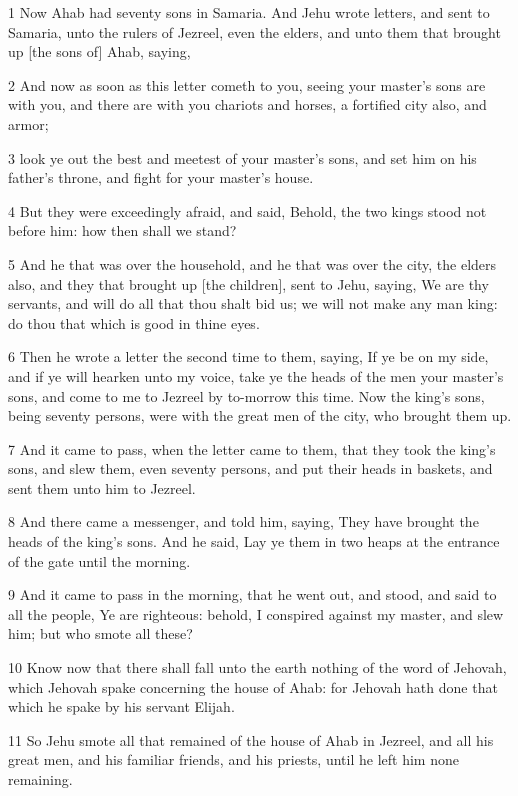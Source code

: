 \par 1 Now Ahab had seventy sons in Samaria. And Jehu wrote letters, and sent to Samaria, unto the rulers of Jezreel, even the elders, and unto them that brought up [the sons of] Ahab, saying,
\par 2 And now as soon as this letter cometh to you, seeing your master's sons are with you, and there are with you chariots and horses, a fortified city also, and armor;
\par 3 look ye out the best and meetest of your master's sons, and set him on his father's throne, and fight for your master's house.
\par 4 But they were exceedingly afraid, and said, Behold, the two kings stood not before him: how then shall we stand?
\par 5 And he that was over the household, and he that was over the city, the elders also, and they that brought up [the children], sent to Jehu, saying, We are thy servants, and will do all that thou shalt bid us; we will not make any man king: do thou that which is good in thine eyes.
\par 6 Then he wrote a letter the second time to them, saying, If ye be on my side, and if ye will hearken unto my voice, take ye the heads of the men your master's sons, and come to me to Jezreel by to-morrow this time. Now the king's sons, being seventy persons, were with the great men of the city, who brought them up.
\par 7 And it came to pass, when the letter came to them, that they took the king's sons, and slew them, even seventy persons, and put their heads in baskets, and sent them unto him to Jezreel.
\par 8 And there came a messenger, and told him, saying, They have brought the heads of the king's sons. And he said, Lay ye them in two heaps at the entrance of the gate until the morning.
\par 9 And it came to pass in the morning, that he went out, and stood, and said to all the people, Ye are righteous: behold, I conspired against my master, and slew him; but who smote all these?
\par 10 Know now that there shall fall unto the earth nothing of the word of Jehovah, which Jehovah spake concerning the house of Ahab: for Jehovah hath done that which he spake by his servant Elijah.
\par 11 So Jehu smote all that remained of the house of Ahab in Jezreel, and all his great men, and his familiar friends, and his priests, until he left him none remaining.
